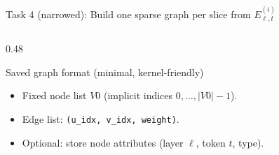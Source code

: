 \documentclass[aspectratio=169,xcolor={dvipsnames}]{beamer}
\begin{document}
\begin{frame}[fragile,shrink=34]{Task 4 (narrowed): Build one sparse graph per slice from $E^{(i)}_{\ell,t}$}
\begin{columns}[T,onlytextwidth]
\begin{column}{0.48\textwidth}


\vspace{1mm}
\begin{block}{Saved graph format (minimal, kernel-friendly)}
\footnotesize
\begin{itemize}\setlength\itemsep{2pt}
\item Fixed node list $V0$ (implicit indices $0,\dots,|V0|-1$).
\item Edge list: \texttt{(u\_idx, v\_idx, weight)}.
\item Optional: store node attributes (layer $\ell$, token $t$, type).
\end{itemize}
\end{block}
\end{column}
\end{columns}
\end{frame}
\end{document}
